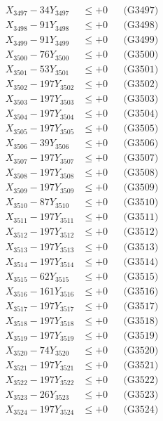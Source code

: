 \documentclass[a4paper,10pt]{article}
\begin{document}
{\begin{align}
X_{3497} - 34Y_{3497} &\leq +0 && \text{(G3497)} \\
X_{3498} - 91Y_{3498} &\leq +0 && \text{(G3498)} \\
X_{3499} - 91Y_{3499} &\leq +0 && \text{(G3499)} \\
X_{3500} - 76Y_{3500} &\leq +0 && \text{(G3500)} \\
\allowbreak
X_{3501} - 53Y_{3501} &\leq +0 && \text{(G3501)} \\
X_{3502} - 197Y_{3502} &\leq +0 && \text{(G3502)} \\
X_{3503} - 197Y_{3503} &\leq +0 && \text{(G3503)} \\
X_{3504} - 197Y_{3504} &\leq +0 && \text{(G3504)} \\
X_{3505} - 197Y_{3505} &\leq +0 && \text{(G3505)} \\
X_{3506} - 39Y_{3506} &\leq +0 && \text{(G3506)} \\
X_{3507} - 197Y_{3507} &\leq +0 && \text{(G3507)} \\
X_{3508} - 197Y_{3508} &\leq +0 && \text{(G3508)} \\
X_{3509} - 197Y_{3509} &\leq +0 && \text{(G3509)} \\
X_{3510} - 87Y_{3510} &\leq +0 && \text{(G3510)} \\
\allowbreak
X_{3511} - 197Y_{3511} &\leq +0 && \text{(G3511)} \\
X_{3512} - 197Y_{3512} &\leq +0 && \text{(G3512)} \\
X_{3513} - 197Y_{3513} &\leq +0 && \text{(G3513)} \\
X_{3514} - 197Y_{3514} &\leq +0 && \text{(G3514)} \\
X_{3515} - 62Y_{3515} &\leq +0 && \text{(G3515)} \\
X_{3516} - 161Y_{3516} &\leq +0 && \text{(G3516)} \\
X_{3517} - 197Y_{3517} &\leq +0 && \text{(G3517)} \\
X_{3518} - 197Y_{3518} &\leq +0 && \text{(G3518)} \\
X_{3519} - 197Y_{3519} &\leq +0 && \text{(G3519)} \\
X_{3520} - 74Y_{3520} &\leq +0 && \text{(G3520)} \\
\allowbreak
X_{3521} - 197Y_{3521} &\leq +0 && \text{(G3521)} \\
X_{3522} - 197Y_{3522} &\leq +0 && \text{(G3522)} \\
X_{3523} - 26Y_{3523} &\leq +0 && \text{(G3523)} \\
X_{3524} - 197Y_{3524} &\leq +0 && \text{(G3524)} \\

\end{align}}
\end{document}
